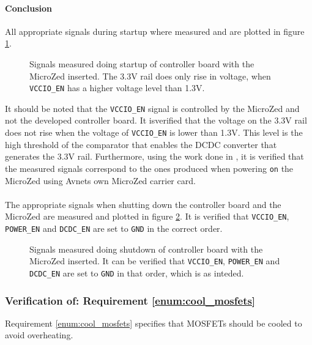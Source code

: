 \paragraph{Conclusion}
All appropriate signals during startup where measured and are plotted in figure \ref{fig:controllerboardv2_startup}.
\begin{figure}[H]
	\centering
	
	\caption[Signals measured doing startup of controller board.]{Signals measured doing startup of controller board with the MicroZed inserted. The 3.3V rail does only rise in voltage, when \texttt{VCCIO\_EN} has a higher voltage level than 1.3V.}
	\label{fig:controllerboardv2_startup}
\end{figure}
It should be noted that the \texttt{VCCIO\_EN} signal is controlled by the MicroZed and not the developed controller board. 
It isverified that the voltage on the 3.3V rail does not rise when the voltage of \texttt{VCCIO\_EN} is lower than 1.3V.
This level is the high threshold of the comparator that enables the DCDC converter that generates the 3.3V rail.
Furthermore, using the work done in \cite{isaswarm}, it is verified that the measured signals correspond to the ones produced when powering \texttt{on} the MicroZed using Avnets own MicroZed carrier card.
\\~\\
The appropriate signals when shutting down the controller board and the MicroZed are measured and plotted in figure \ref{fig:controllerboardv2_shutdown}.
It is verified that \texttt{VCCIO\_EN}, \texttt{POWER\_EN} and \texttt{DCDC\_EN} are set to \texttt{GND} in the correct order. 
\begin{figure}[H]
	\centering
    
	\caption[Signals measured doing shutdown of controller board.]{Signals measured doing shutdown of controller board with the MicroZed inserted. It can be verified that \texttt{VCCIO\_EN}, \texttt{POWER\_EN} and \texttt{DCDC\_EN} are set to \texttt{GND} in that order, which is as inteded.}
	\label{fig:controllerboardv2_shutdown}
\end{figure}

\subsubsection{Verification of: Requirement \ref{enum:cool_mosfets}} %
\label{ssub:requirement_ref_enum:cool_mosfets}
Requirement \ref{enum:cool_mosfets} specifies that MOSFETs should be cooled to avoid overheating. 

